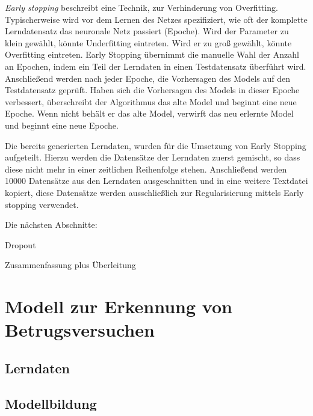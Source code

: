 \begin{definition}
\begin{shaded}
\emph{Early stopping} beschreibt eine Technik, zur Verhinderung von Overfitting. Typischerweise wird vor dem Lernen des Netzes spezifiziert, wie oft der komplette Lerndatensatz das neuronale Netz passiert (Epoche). Wird der Parameter zu klein gewählt, könnte Underfitting eintreten. Wird er zu groß gewählt, könnte Overfitting eintreten. Early Stopping übernimmt die manuelle Wahl der Anzahl an Epochen, indem ein Teil der Lerndaten in einen Testdatensatz überführt wird. Anschließend werden nach jeder Epoche, die Vorhersagen des Models auf den Testdatensatz geprüft. Haben sich die Vorhersagen des Models in dieser Epoche verbessert, überschreibt der Algorithmus das alte Model und beginnt eine neue Epoche. Wenn nicht behält er das alte Model, verwirft das neu erlernte Model und beginnt eine neue Epoche.  
\label{def:early}
\end{shaded}
\end{definition} 

Die bereits generierten Lerndaten, wurden für die Umsetzung von Early Stopping aufgeteilt. Hierzu werden die Datensätze der Lerndaten zuerst gemischt, so dass diese nicht mehr in einer zeitlichen Reihenfolge stehen. Anschließend werden 10000 Datensätze aus den Lerndaten ausgeschnitten und in eine weitere Textdatei kopiert, diese Datensätze werden ausschließlich zur Regularisierung mittels Early stopping verwendet. 

Die nächsten Abschnitte:

Dropout

Zusammenfassung plus Überleitung

\section{Modell zur Erkennung von Betrugsversuchen}
\label{sec:usecase2}

\subsection{Lerndaten}
\label{subsec:Lerndaten32}


\subsection{Modellbildung}
\label{subsec:Neuro32}